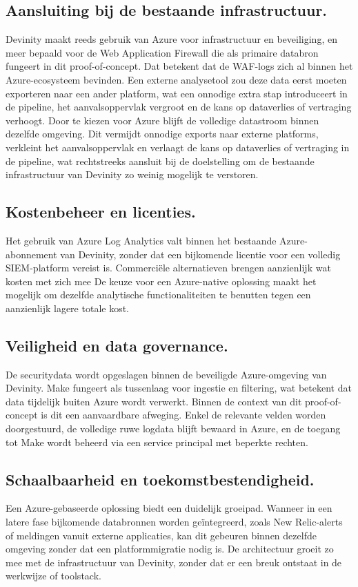 \subsection{Aansluiting bij de bestaande infrastructuur.}
Devinity maakt reeds gebruik van Azure voor infrastructuur en beveiliging, en meer bepaald voor de Web Application Firewall die als primaire databron fungeert in dit proof-of-concept. Dat betekent dat de WAF-logs zich al binnen het Azure-ecosysteem bevinden. Een externe analysetool zou deze data eerst moeten exporteren naar een ander platform, wat een onnodige extra stap introduceert in de pipeline, het aanvalsoppervlak vergroot en de kans op dataverlies of vertraging verhoogt. Door te kiezen voor Azure blijft de volledige datastroom binnen dezelfde omgeving. Dit vermijdt onnodige exports naar externe platforms, verkleint het aanvalsoppervlak en verlaagt de kans op dataverlies of vertraging in de pipeline, wat rechtstreeks aansluit bij de doelstelling om de bestaande infrastructuur van Devinity zo weinig mogelijk te verstoren.

\subsection{Kostenbeheer en licenties.}
Het gebruik van Azure Log Analytics valt binnen het bestaande Azure-abonnement van Devinity, zonder dat een bijkomende licentie voor een volledig SIEM-platform vereist is. Commerciële alternatieven brengen aanzienlijk wat kosten met zich mee De keuze voor een Azure-native oplossing maakt het mogelijk om dezelfde analytische functionaliteiten te benutten tegen een aanzienlijk lagere totale kost.

\subsection{Veiligheid en data governance.}
De securitydata wordt opgeslagen binnen de beveiligde Azure-omgeving van Devinity. Make fungeert als tussenlaag voor ingestie en filtering, wat betekent dat data tijdelijk buiten Azure wordt verwerkt. Binnen de context van dit proof-of-concept is dit een aanvaardbare afweging. Enkel de relevante velden worden doorgestuurd, de volledige ruwe logdata blijft bewaard in Azure, en de toegang tot Make wordt beheerd via een service principal met beperkte rechten.

\subsection{Schaalbaarheid en toekomstbestendigheid.}
Een Azure-gebaseerde oplossing biedt een duidelijk groeipad. Wanneer in een latere fase bijkomende databronnen worden geïntegreerd, zoals New Relic-alerts of meldingen vanuit externe applicaties, kan dit gebeuren binnen dezelfde omgeving zonder dat een platformmigratie nodig is. De architectuur groeit zo mee met de infrastructuur van Devinity, zonder dat er een breuk ontstaat in de werkwijze of toolstack.

